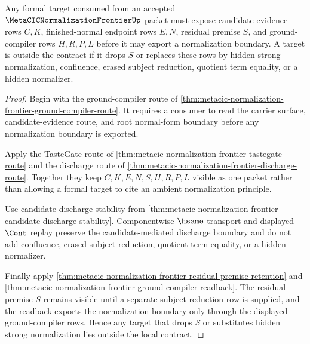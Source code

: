\begin{theorem}
\label{thm:metacic-critical-path-formal-target-contract}
Any formal target consumed from an accepted $\MetaCICNormalizationFrontierUp$ packet must expose candidate evidence rows $C,K$, finished-normal endpoint rows $E,N$, residual premise $S$, and ground-compiler rows $H,R,P,L$ before it may export a normalization boundary. A target is outside the contract if it drops $S$ or replaces these rows by hidden strong normalization, confluence, erased subject reduction, quotient term equality, or a hidden normalizer.
\end{theorem}
\begin{proof}
Begin with the ground-compiler route of \autoref{thm:metacic-normalization-frontier-ground-compiler-route}. It requires a consumer to read the carrier surface, candidate-evidence route, and root normal-form boundary before any normalization boundary is exported.

Apply the TasteGate route of \autoref{thm:metacic-normalization-frontier-tastegate-route} and the discharge route of \autoref{thm:metacic-normalization-frontier-discharge-route}. Together they keep $C,K,E,N,S,H,R,P,L$ visible as one packet rather than allowing a formal target to cite an ambient normalization principle.

Use candidate-discharge stability from \autoref{thm:metacic-normalization-frontier-candidate-discharge-stability}. Componentwise $\hsame$ transport and displayed $\Cont$ replay preserve the candidate-mediated discharge boundary and do not add confluence, erased subject reduction, quotient term equality, or a hidden normalizer.

Finally apply \autoref{thm:metacic-normalization-frontier-residual-premise-retention} and \autoref{thm:metacic-normalization-frontier-ground-compiler-readback}. The residual premise $S$ remains visible until a separate subject-reduction row is supplied, and the readback exports the normalization boundary only through the displayed ground-compiler rows. Hence any target that drops $S$ or substitutes hidden strong normalization lies outside the local contract.
\end{proof}


